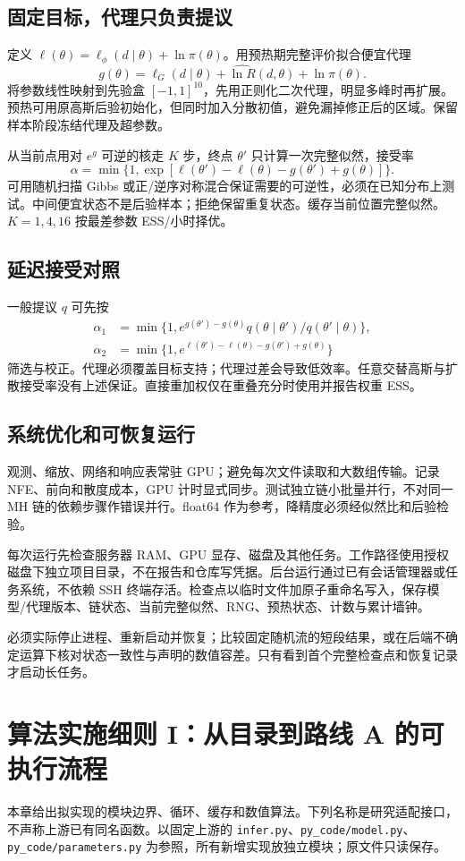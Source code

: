\documentclass[UTF8,fontset=none,a4paper,11pt]{ctexart}
\newcommand{\chapterpage}[1]{\section{#1}}
\begin{document}
\subsection{固定目标，代理只负责提议}
定义 $\ell(\theta)=\ell_\phi(d\mid\theta)+\ln\pi(\theta)$。用预热期完整评价拟合便宜代理
\begin{equation}
g(\theta)=\ell_G(d\mid\theta)+\widehat{\ln R}(d,\theta)+\ln\pi(\theta).
\end{equation}
将参数线性映射到先验盒 $[-1,1]^{10}$，先用正则化二次代理，明显多峰时再扩展。预热可用原高斯后验初始化，但同时加入分散初值，避免漏掉修正后的区域。保留样本阶段冻结代理及超参数。
\par 从当前点用对 $e^g$ 可逆的核走 $K$ 步，终点 $\theta'$ 只计算一次完整似然，接受率
\begin{equation}
\alpha=\min\{1,\exp[\ell(\theta')-\ell(\theta)-g(\theta')+g(\theta)]\}.
\end{equation}
可用随机扫描 Gibbs 或正/逆序对称混合保证需要的可逆性，必须在已知分布上测试。中间便宜状态不是后验样本；拒绝保留重复状态。缓存当前位置完整似然。$K=1,4,16$ 按最差参数 ESS/小时择优。
\subsection{延迟接受对照}
一般提议 $q$ 可先按
\begin{align}
\alpha_1&=\min\{1,e^{g(\theta')-g(\theta)}q(\theta\mid\theta')/q(\theta'\mid\theta)\},\\
\alpha_2&=\min\{1,e^{\ell(\theta')-\ell(\theta)-g(\theta')+g(\theta)}\}
\end{align}
筛选与校正。代理必须覆盖目标支持；代理过差会导致低效率。任意交替高斯与扩散接受率没有上述保证。直接重加权仅在重叠充分时使用并报告权重 ESS。
\subsection{系统优化和可恢复运行}
观测、缩放、网络和响应表常驻 GPU；避免每次文件读取和大数组传输。记录 NFE、前向和散度成本，GPU 计时显式同步。测试独立链小批量并行，不对同一 MH 链的依赖步骤作错误并行。float64 作为参考，降精度必须经似然比和后验检验。
\par 每次运行先检查服务器 RAM、GPU 显存、磁盘及其他任务。工作路径使用授权磁盘下独立项目目录，不在报告和仓库写凭据。后台运行通过已有会话管理器或任务系统，不依赖 SSH 终端存活。检查点以临时文件加原子重命名写入，保存模型/代理版本、链状态、当前完整似然、RNG、预热状态、计数与累计墙钟。
\par 必须实际停止进程、重新启动并恢复；比较固定随机流的短段结果，或在后端不确定运算下核对状态一致性与声明的数值容差。只有看到首个完整检查点和恢复记录才启动长任务。
\chapterpage{算法实施细则 I：从目录到路线 A 的可执行流程}
本章给出拟实现的模块边界、循环、缓存和数值算法。下列名称是研究适配接口，不声称上游已有同名函数。以固定上游的 \texttt{infer.py}、\texttt{py\_code/model.py}、\texttt{py\_code/parameters.py} 为参照，所有新增实现放独立模块；原文件只读保存。
\end{document}
